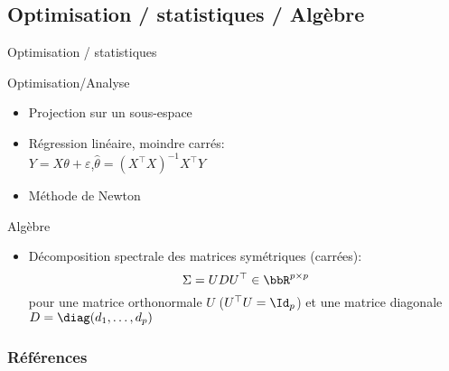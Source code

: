 \documentclass{beamer}
\begin{document}
\subsection{Optimisation / statistiques / Alg\`ebre}
\begin{frame}{Optimisation / statistiques} 
\begin{exampleblock}{Optimisation/Analyse}
\begin{itemize}
 \item Projection sur un sous-espace
 \item R\'egression lin\'eaire, moindre carr\'es:\\
$Y=X\theta+\varepsilon$,\quad $\hat{\theta}=(X^\top X)^{-1}X^\top Y $
 \item M\'ethode de Newton
\end{itemize}
\end{exampleblock}

\begin{exampleblock}{Alg\`ebre}
\begin{itemize}
 \item D\'ecomposition spectrale des matrices symétriques (carr\'ees): 
\begin{equation*}
\Sigma=UDU^{\top} \in \bbR^{p \times p}
\end{equation*}
pour une matrice orthonormale  $U$ (\ie $U^\top U =\Id_p$) et une matrice diagonale $D=\diag(d_1,\dots,d_p)$
\end{itemize}
\end{exampleblock}
\end{frame}

\begin{frame}[allowframebreaks]
\frametitle{R\'ef\'erences}

\end{frame}
\end{document}
